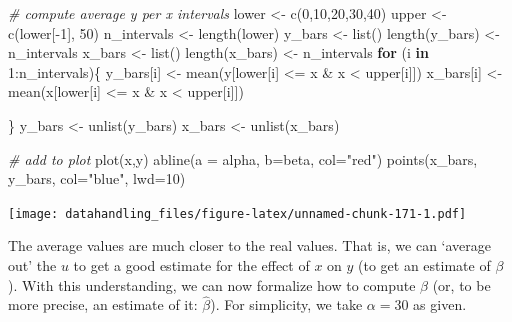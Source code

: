 \documentclass[
  12pt,
]{style/krantz}
\newenvironment{Shaded}{\begin{snugshade}}{\end{snugshade}}
\newcommand{\AttributeTok}[1]{\textcolor[rgb]{0.77,0.63,0.00}{#1}}
\newcommand{\CommentTok}[1]{\textcolor[rgb]{0.56,0.35,0.01}{\textit{#1}}}
\newcommand{\ControlFlowTok}[1]{\textcolor[rgb]{0.13,0.29,0.53}{\textbf{#1}}}
\newcommand{\DecValTok}[1]{\textcolor[rgb]{0.00,0.00,0.81}{#1}}
\newcommand{\FunctionTok}[1]{\textcolor[rgb]{0.00,0.00,0.00}{#1}}
\newcommand{\NormalTok}[1]{#1}
\newcommand{\OtherTok}[1]{\textcolor[rgb]{0.56,0.35,0.01}{#1}}
\newcommand{\SpecialCharTok}[1]{\textcolor[rgb]{0.00,0.00,0.00}{#1}}
\newcommand{\StringTok}[1]{\textcolor[rgb]{0.31,0.60,0.02}{#1}}
\begin{document}
\begin{Shaded}
\begin{Highlighting}[]
\CommentTok{\# compute average y per x intervals}
\NormalTok{lower }\OtherTok{\textless{}{-}} \FunctionTok{c}\NormalTok{(}\DecValTok{0}\NormalTok{,}\DecValTok{10}\NormalTok{,}\DecValTok{20}\NormalTok{,}\DecValTok{30}\NormalTok{,}\DecValTok{40}\NormalTok{)}
\NormalTok{upper }\OtherTok{\textless{}{-}} \FunctionTok{c}\NormalTok{(lower[}\SpecialCharTok{{-}}\DecValTok{1}\NormalTok{], }\DecValTok{50}\NormalTok{)}
\NormalTok{n\_intervals }\OtherTok{\textless{}{-}} \FunctionTok{length}\NormalTok{(lower)}
\NormalTok{y\_bars }\OtherTok{\textless{}{-}} \FunctionTok{list}\NormalTok{()}
\FunctionTok{length}\NormalTok{(y\_bars) }\OtherTok{\textless{}{-}}\NormalTok{ n\_intervals}
\NormalTok{x\_bars }\OtherTok{\textless{}{-}} \FunctionTok{list}\NormalTok{()}
\FunctionTok{length}\NormalTok{(x\_bars) }\OtherTok{\textless{}{-}}\NormalTok{ n\_intervals}
\ControlFlowTok{for}\NormalTok{ (i }\ControlFlowTok{in} \DecValTok{1}\SpecialCharTok{:}\NormalTok{n\_intervals)\{}
\NormalTok{  y\_bars[i] }\OtherTok{\textless{}{-}} \FunctionTok{mean}\NormalTok{(y[lower[i] }\SpecialCharTok{\textless{}=}\NormalTok{ x }\SpecialCharTok{\&}\NormalTok{ x }\SpecialCharTok{\textless{}}\NormalTok{ upper[i]])}
\NormalTok{  x\_bars[i] }\OtherTok{\textless{}{-}} \FunctionTok{mean}\NormalTok{(x[lower[i] }\SpecialCharTok{\textless{}=}\NormalTok{ x }\SpecialCharTok{\&}\NormalTok{ x }\SpecialCharTok{\textless{}}\NormalTok{ upper[i]])}

\NormalTok{\}}
\NormalTok{y\_bars }\OtherTok{\textless{}{-}} \FunctionTok{unlist}\NormalTok{(y\_bars)}
\NormalTok{x\_bars }\OtherTok{\textless{}{-}} \FunctionTok{unlist}\NormalTok{(x\_bars)}

\CommentTok{\# add to plot}
\FunctionTok{plot}\NormalTok{(x,y)}
\FunctionTok{abline}\NormalTok{(}\AttributeTok{a =}\NormalTok{ alpha, }\AttributeTok{b=}\NormalTok{beta, }\AttributeTok{col=}\StringTok{"red"}\NormalTok{)}
\FunctionTok{points}\NormalTok{(x\_bars, y\_bars, }\AttributeTok{col=}\StringTok{"blue"}\NormalTok{, }\AttributeTok{lwd=}\DecValTok{10}\NormalTok{)}
\end{Highlighting}
\end{Shaded}

\texttt{[image: datahandling\_files/figure-latex/unnamed-chunk-171-1.pdf]}

The average values are much closer to the real values. That is, we can `average out' the \(u\) to get a good estimate for the effect of \(x\) on \(y\) (to get an estimate of \(\beta\)). With this understanding, we can now formalize how to compute \(\beta\) (or, to be more precise, an estimate of it: \(\hat{\beta}\)). For simplicity, we take \(\alpha=30\) as given.
\end{document}
